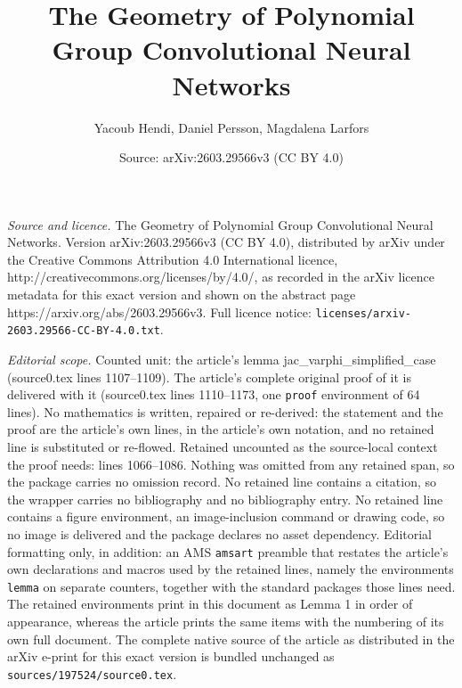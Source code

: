 \documentclass[10pt,a4paper]{amsart}
\title{The Geometry of Polynomial Group Convolutional Neural Networks}
\author{Yacoub Hendi, Daniel Persson, Magdalena Larfors}
\date{Source: arXiv:2603.29566v3 (CC BY 4.0)}
\begin{document}
\maketitle

\noindent\emph{Source and licence.} The Geometry of Polynomial Group Convolutional Neural Networks. Version arXiv:2603.29566v3 (CC BY 4.0), distributed by arXiv under the Creative Commons Attribution 4.0 International licence, http://creativecommons.org/licenses/by/4.0/, as recorded in the arXiv licence metadata for this exact version and shown on the abstract page https://arxiv.org/abs/2603.29566v3. Full licence notice: \texttt{licenses/arxiv-2603.29566-CC-BY-4.0.txt}.\par\smallskip

\noindent\textit{Editorial scope.} Counted unit: the article's lemma jac\_varphi\_simplified\_case (source0.tex lines 1107--1109). The article's complete original proof of it is delivered with it (source0.tex lines 1110--1173, one \texttt{proof} environment of 64 lines). No mathematics is written, repaired or re-derived: the statement and the proof are the article's own lines, in the article's own notation, and no retained line is substituted or re-flowed.  Retained uncounted as the source-local context the proof needs: lines 1066--1086.  Nothing was omitted from any retained span, so the package carries no omission record.  No retained line contains a citation, so the wrapper carries no bibliography and no bibliography entry.  No retained line contains a figure environment, an image-inclusion command or drawing code, so no image is delivered and the package declares no asset dependency.  Editorial formatting only, in addition: an AMS \texttt{amsart} preamble that restates the article's own declarations and macros used by the retained lines, namely the environments \texttt{lemma} on separate counters, together with the standard packages those lines need.  The retained environments print in this document as Lemma 1 in order of appearance, whereas the article prints the same items with the numbering of its own full document.  The complete native source of the article as distributed in the arXiv e-print for this exact version is bundled unchanged as \texttt{sources/197524/source0.tex}.
\end{document}
